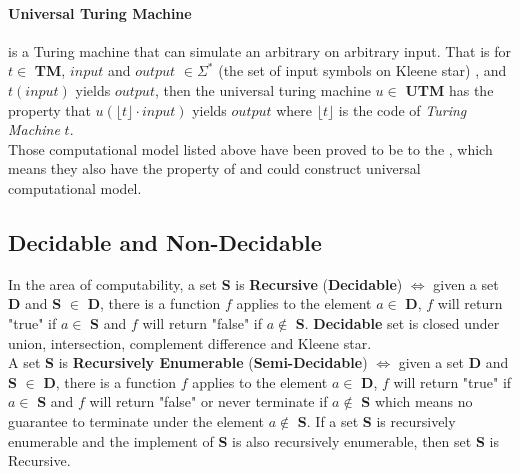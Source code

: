 \paragraph{Universal Turing Machine} is a Turing machine that can simulate an arbitrary  on arbitrary input\cite{_universal_2016}. 
That is for $t \in$ \textbf{TM}, $input$ and $output$ $\in \Sigma^{*}$ (the set of input symbols on Kleene star\cite{jiraskova_kleene_2013}) , and $t(input)$ yields $output$, then the universal turing machine $u\in$ \textbf{UTM} has the property that $u(\lfloor t\rfloor \cdot input)$ yields $output$ where $\lfloor t\rfloor$ is the code of \textit{Turing Machine} $t$.\\
Those computational model listed above have been proved to be  to the , which means they also have the property of  and could construct universal computational model.

\subsection{Decidable and Non-Decidable}
In the area of computability, a set \textbf{S} is \textbf{Recursive} (\textbf{Decidable}) $\iff$ given a set \textbf{D} and \textbf{S} $\in$ \textbf{D}, there is a function $f$ applies to the element $a \in$ \textbf{D},
$f$ will return "true" if $a \in$ \textbf{S} and $f$ will return "false" if $a \notin$ \textbf{S}\cite{jones_computability_1997}.
\textbf{Decidable} set is closed under union, intersection, complement difference and Kleene star\cite{_recursive_2015}.\\
A set \textbf{S} is \textbf{Recursively Enumerable} (\textbf{Semi-Decidable}) $\iff$ given a set \textbf{D} and \textbf{S} $\in$ \textbf{D}, there is a function $f$ applies to the element $a \in$ \textbf{D},
$f$ will return "true" if $a \in$ \textbf{S} and $f$ will return "false" or never terminate if $a \notin$ \textbf{S} which means no guarantee to terminate under the element $a \notin$ \textbf{S}\cite{jones_computability_1997}.
If a set \textbf{S} is recursively enumerable and the implement of \textbf{S} is also recursively enumerable, then set \textbf{S} is Recursive\cite{_recursively_2015}.

